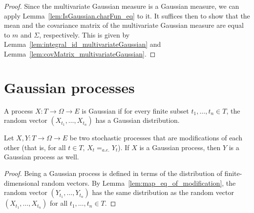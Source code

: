 \begin{proof}\leanok
Since the multivariate Gaussian measure is a Gaussian measure, we can apply Lemma~\ref{lem:IsGaussian.charFun_eq} to it.
It suffices then to show that the mean and the covariance matrix of the multivariate Gaussian measure are equal to $m$ and $\Sigma$, respectively.
This is given by Lemma~\ref{lem:integral_id_multivariateGaussian} and Lemma~\ref{lem:covMatrix_multivariateGaussian}.
\end{proof}


\section{Gaussian processes}
\label{sec:gaussian_processes}

\begin{definition}\label{def:IsGaussianProcess}
  \leanok
A process $X : T \to \Omega \to E$ is Gaussian if for every finite subset $t_1, \ldots, t_n \in T$, the random vector $(X_{t_1}, \ldots, X_{t_n})$ has a Gaussian distribution.
\end{definition}


\begin{lemma}\label{lem:isGaussianProcess_of_modification}
  \leanok
Let $X, Y : T \to \Omega \to E$ be two stochastic processes that are modifications of each other (that is, for all $t \in T$, $X_t =_{a.e.} Y_t$).
If $X$ is a Gaussian process, then $Y$ is a Gaussian process as well.
\end{lemma}

\begin{proof}\leanok
Being a Gaussian process is defined in terms of the distribution of finite-dimensional random vectors.
By Lemma~\ref{lem:map_eq_of_modification}, the random vector $(Y_{t_1}, \ldots, Y_{t_n})$ has the same distribution as the random vector $(X_{t_1}, \ldots, X_{t_n})$ for all $t_1, \ldots, t_n \in T$.
\end{proof}
